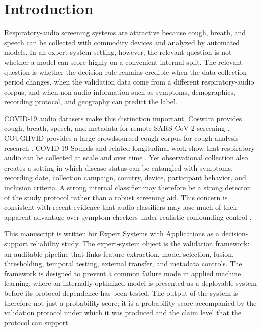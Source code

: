\documentclass[preprint,12pt]{elsarticle}
\begin{document}
\section{Introduction}

Respiratory-audio screening systems are attractive because cough, breath, and speech can be collected with commodity devices and analyzed by automated models. In an expert-system setting, however, the relevant question is not whether a model can score highly on a convenient internal split. The relevant question is whether the decision rule remains credible when the data collection period changes, when the validation data come from a different respiratory-audio corpus, and when non-audio information such as symptoms, demographics, recording protocol, and geography can predict the label.

COVID-19 audio datasets make this distinction important. Coswara provides cough, breath, speech, and metadata for remote SARS-CoV-2 screening \citep{bhattacharya2023coswara}. COUGHVID provides a large crowdsourced cough corpus for cough-analysis research \citep{orlandic2021coughvid}. COVID-19 Sounds and related longitudinal work show that respiratory audio can be collected at scale and over time \citep{xia2021covid,dang2022longitudinal,han2022sounds}. Yet observational collection also creates a setting in which disease status can be entangled with symptoms, recording date, collection campaign, country, device, participant behavior, and inclusion criteria. A strong internal classifier may therefore be a strong detector of the study protocol rather than a robust screening aid. This concern is consistent with recent evidence that audio classifiers may lose much of their apparent advantage over symptom checkers under realistic confounding control \citep{coppock2024audio}.

This manuscript is written for Expert Systems with Applications as a decision-support reliability study. The expert-system object is the validation framework: an auditable pipeline that links feature extraction, model selection, fusion, thresholding, temporal testing, external transfer, and metadata controls. The framework is designed to prevent a common failure mode in applied machine learning, where an internally optimized model is presented as a deployable system before its protocol dependence has been tested. The output of the system is therefore not just a probability score; it is a probability score accompanied by the validation protocol under which it was produced and the claim level that the protocol can support.
\end{document}
